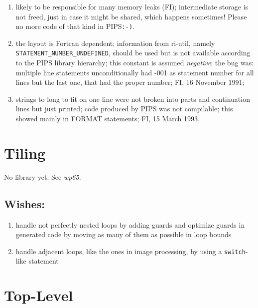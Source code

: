 \begin{enumerate}

  \item likely to be responsible for many memory leaks (FI); intermediate
        storage is not freed, just in case it might be shared, which happens
        sometimes! Please no more code of that kind in PIPS\verb+:-)+.

  \item the layout is Fortran dependent; information from ri-util,
        namely \verb+STATEMENT_NUMBER_UNDEFINED+, should be used but is
        not available according to the PIPS library hierarchy; this constant
        is assumed {\em negative}; the bug was: multiple line statements
        unconditionally had -001 as statement number for all lines but
        the last one, that had the proper number; FI, 16 November 1991;

  \item strings to long to fit on one line were not broken into parts
        and continuation lines but just printed; code produced by PIPS
        was not compilable; this showed mainly in FORMAT statements;
        FI, 15 March 1993.

\end{enumerate}

\section{Tiling}

No library yet. See {\em wp65}.

\subsection{Wishes:}

\begin{enumerate}

  \item handle not perfectly nested loops by adding guards and optimize
        guards in generated code by moving as many of them as possible
        in loop bounds

  \item handle adjacent loops, like the ones in image processing, by
        using a \verb+switch+-like statement

\end{enumerate}

\section{Top-Level}

